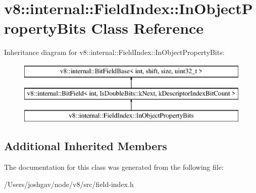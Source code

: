 \hypertarget{classv8_1_1internal_1_1_field_index_1_1_in_object_property_bits}{}\section{v8\+:\+:internal\+:\+:Field\+Index\+:\+:In\+Object\+Property\+Bits Class Reference}
\label{classv8_1_1internal_1_1_field_index_1_1_in_object_property_bits}
Inheritance diagram for v8\+:\+:internal\+:\+:Field\+Index\+:\+:In\+Object\+Property\+Bits\+:\begin{figure}[H]
\begin{center}
\leavevmode
\includegraphics[height=3.000000cm]{classv8_1_1internal_1_1_field_index_1_1_in_object_property_bits}
\end{center}
\end{figure}
\subsection*{Additional Inherited Members}


The documentation for this class was generated from the following file\+:\begin{DoxyCompactItemize}
\item 
/\+Users/joshgav/node/v8/src/field-\/index.\+h\end{DoxyCompactItemize}
